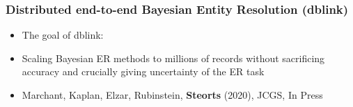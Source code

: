 \documentclass[9pt]{beamer}
\begin{document}
\addtocounter{framenumber}{-1}



\begin{frame}
\frametitle{Distributed end-to-end Bayesian Entity Resolution (dblink)}

\begin{itemize}
\item The goal of dblink:
\vfill
\item[] Scaling Bayesian ER methods to millions of records without  sacrificing accuracy
   and crucially giving uncertainty of the ER task 
\vfill   
\item[]   Marchant, Kaplan, Elzar, Rubinstein, \textbf{Steorts} (2020), JCGS, In Press
\end{itemize} 
\vfill

\end{frame}

\end{document}
